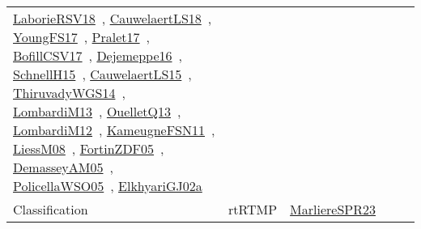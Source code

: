 {\begin{longtable}{lp{3cm}>{\raggedright\arraybackslash}p{6cm}>{\raggedright\arraybackslash}p{6cm}>{\raggedright\arraybackslash}p{8cm}}
\href{../works/LaborieRSV18.pdf}{LaborieRSV18}~\cite{LaborieRSV18}, \href{../works/CauwelaertLS18.pdf}{CauwelaertLS18}~\cite{CauwelaertLS18}, \href{../works/YoungFS17.pdf}{YoungFS17}~\cite{YoungFS17}, \href{../works/Pralet17.pdf}{Pralet17}~\cite{Pralet17}, \href{../works/BofillCSV17.pdf}{BofillCSV17}~\cite{BofillCSV17}, \href{../works/Dejemeppe16.pdf}{Dejemeppe16}~\cite{Dejemeppe16}, \href{../works/SchnellH15.pdf}{SchnellH15}~\cite{SchnellH15}, \href{../works/CauwelaertLS15.pdf}{CauwelaertLS15}~\cite{CauwelaertLS15}, \href{../works/ThiruvadyWGS14.pdf}{ThiruvadyWGS14}~\cite{ThiruvadyWGS14}, \href{../works/LombardiM13.pdf}{LombardiM13}~\cite{LombardiM13}, \href{../works/OuelletQ13.pdf}{OuelletQ13}~\cite{OuelletQ13}, \href{../works/LombardiM12.pdf}{LombardiM12}~\cite{LombardiM12}, \href{../works/KameugneFSN11.pdf}{KameugneFSN11}~\cite{KameugneFSN11}, \href{../works/LiessM08.pdf}{LiessM08}~\cite{LiessM08}, \href{../works/FortinZDF05.pdf}{FortinZDF05}~\cite{FortinZDF05}, \href{../works/DemasseyAM05.pdf}{DemasseyAM05}~\cite{DemasseyAM05}, \href{../works/PolicellaWSO05.pdf}{PolicellaWSO05}~\cite{PolicellaWSO05}, \href{../works/ElkhyariGJ02a.pdf}{ElkhyariGJ02a}~\cite{ElkhyariGJ02a}\\
\index{rtRTMP}\index{Classification!rtRTMP}Classification & rtRTMP & \href{../works/MarliereSPR23.pdf}{MarliereSPR23}~\cite{MarliereSPR23} &  & \\

\end{longtable}}
